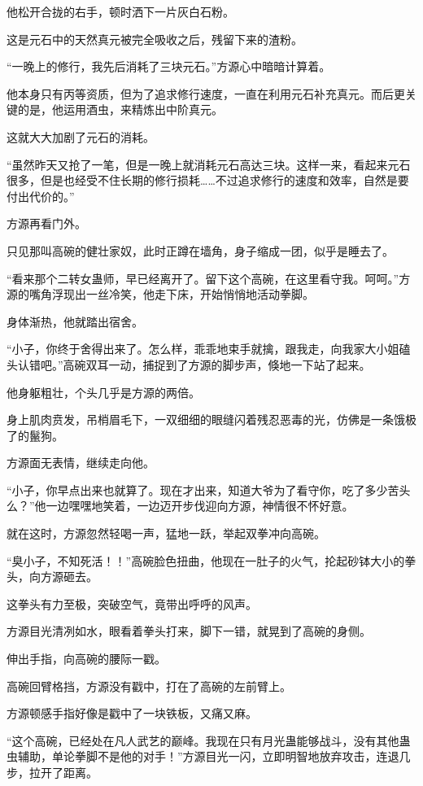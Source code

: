 \begin{this_body}
他松开合拢的右手，顿时洒下一片灰白石粉。

这是元石中的天然真元被完全吸收之后，残留下来的渣粉。

“一晚上的修行，我先后消耗了三块元石。”方源心中暗暗计算着。

他本身只有丙等资质，但为了追求修行速度，一直在利用元石补充真元。而后更关键的是，他运用酒虫，来精炼出中阶真元。

这就大大加剧了元石的消耗。

“虽然昨天又抢了一笔，但是一晚上就消耗元石高达三块。这样一来，看起来元石很多，但是也经受不住长期的修行损耗……不过追求修行的速度和效率，自然是要付出代价的。”

方源再看门外。

只见那叫高碗的健壮家奴，此时正蹲在墙角，身子缩成一团，似乎是睡去了。

“看来那个二转女蛊师，早已经离开了。留下这个高碗，在这里看守我。呵呵。”方源的嘴角浮现出一丝冷笑，他走下床，开始悄悄地活动拳脚。

身体渐热，他就踏出宿舍。

“小子，你终于舍得出来了。怎么样，乖乖地束手就擒，跟我走，向我家大小姐磕头认错吧。”高碗双耳一动，捕捉到了方源的脚步声，倏地一下站了起来。

他身躯粗壮，个头几乎是方源的两倍。

身上肌肉贲发，吊梢眉毛下，一双细细的眼缝闪着残忍恶毒的光，仿佛是一条饿极了的鬣狗。

方源面无表情，继续走向他。

“小子，你早点出来也就算了。现在才出来，知道大爷为了看守你，吃了多少苦头么？”他一边嘿嘿地笑着，一边迈开步伐迎向方源，神情很不怀好意。

就在这时，方源忽然轻喝一声，猛地一跃，举起双拳冲向高碗。

“臭小子，不知死活！！”高碗脸色扭曲，他现在一肚子的火气，抡起砂钵大小的拳头，向方源砸去。

这拳头有力至极，突破空气，竟带出呼呼的风声。

方源目光清冽如水，眼看着拳头打来，脚下一错，就晃到了高碗的身侧。

伸出手指，向高碗的腰际一戳。

高碗回臂格挡，方源没有戳中，打在了高碗的左前臂上。

方源顿感手指好像是戳中了一块铁板，又痛又麻。

“这个高碗，已经处在凡人武艺的巅峰。我现在只有月光蛊能够战斗，没有其他蛊虫辅助，单论拳脚不是他的对手！”方源目光一闪，立即明智地放弃攻击，连退几步，拉开了距离。


\end{this_body}
